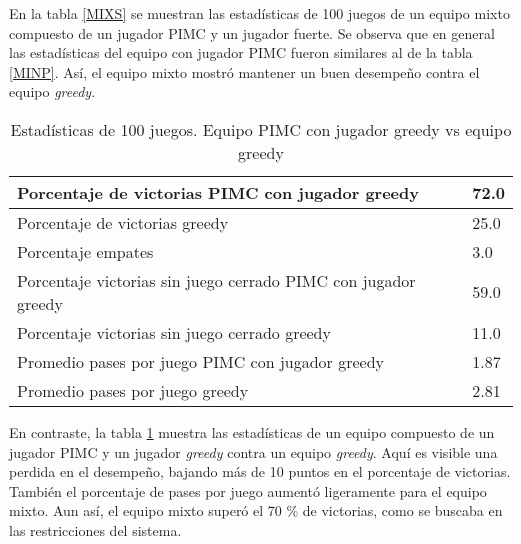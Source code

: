 En la tabla \ref{MIXS} se muestran las estadísticas de 100 juegos de un equipo
mixto compuesto de un jugador PIMC y un jugador fuerte. Se observa que en
general las estadísticas del equipo con jugador PIMC fueron similares al de la
tabla \ref{MINP}. Así, el equipo mixto mostró mantener un buen desempeño contra
el equipo \textit{greedy}.


\begin{table}[!ht]
    \centering
    \caption{Estadísticas de 100 juegos. Equipo PIMC con jugador greedy vs equipo greedy}
    \begin{tabular}{|l|l|}
    \hline
        Porcentaje de victorias PIMC con jugador greedy & 72.0 \\ \hline
        Porcentaje de victorias greedy & 25.0 \\ \hline
        Porcentaje empates & 3.0 \\ \hline
        Porcentaje victorias sin juego cerrado PIMC con jugador greedy & 59.0 \\ \hline
        Porcentaje victorias sin juego cerrado greedy & 11.0 \\ \hline
        Promedio pases por juego PIMC con jugador greedy & 1.87 \\ \hline
        Promedio pases por juego greedy & 2.81 \\ \hline
    \end{tabular}
    \label{MIXG}
\end{table}

En contraste, la tabla \ref{MIXG} muestra las estadísticas de un equipo
compuesto de un jugador PIMC y un jugador \textit{greedy} contra un equipo
\textit{greedy}. Aquí es visible una perdida en el desempeño, bajando más de 10
puntos en el porcentaje de victorias. También el porcentaje de pases por juego
aumentó ligeramente para el equipo mixto. Aun así, el equipo mixto superó el 70
\% de victorias, como se buscaba en las restricciones del sistema.
